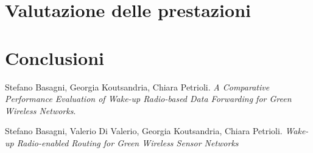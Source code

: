 \documentclass[binding=0.6cm,Lau,noexaminfo]{sapthesis}
\begin{document}
\chapter{Valutazione delle prestazioni}
\chapter{Conclusioni}

\backmatter
\cleardoublepage
{} %

\begin{thebibliography}{9}

    Stefano Basagni, Georgia Koutsandria, Chiara Petrioli.
    \textit{A Comparative Performance Evaluation of Wake-up Radio-based Data Forwarding for Green Wireless Networks}.

    Stefano Basagni, Valerio Di Valerio, Georgia Koutsandria, Chiara Petrioli.
    \textit{Wake-up Radio-enabled Routing for Green Wireless Sensor Networks}
\end{thebibliography}
\end{document}
